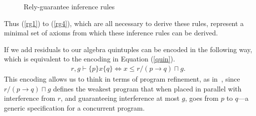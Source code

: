 \documentclass{llncs}
\begin{document}
\begin{figure}[bth]
\centering
\begin{prooftree}
\end{prooftree}

\begin{prooftree}
\end{prooftree}

\begin{prooftree}
\end{prooftree}

\begin{prooftree}
\end{prooftree}

\begin{prooftree}
\end{prooftree}

\begin{prooftree}
\end{prooftree}
\caption{Rely-guarantee inference rules}
\label{fig:rgrules}
\end{figure}

Thus (\ref{rg1}) to (\ref{rg4}), which are all necessary to derive these
rules, represent a minimal set of axioms from which these
inference rules can be derived.

If we add residuals to our algebra quintuples can be encoded in the
following way, which is equivalent to the encoding in Equation
(\ref{quin}).
\begin{align}
r, g \vdash \{p\} x \{q\} \iff x \le r/(p \rightarrow q) \sqcap g \label{refine}.
\end{align}
This encoding allows us to think in terms of program refinement, as in~\cite{hayes_refining_2013}, since
$r/(p \rightarrow q) \sqcap g$ defines the weakest program that when
placed in parallel with interference from $r$, and guaranteeing
interference at most $g$, goes from $p$ to $q$---a generic
specification for a concurrent program.
\end{document}
